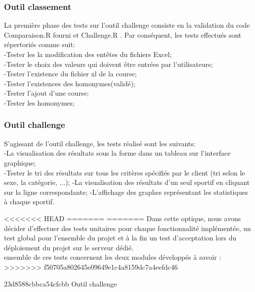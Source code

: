 \subsubsection{Outil classement}
La première phase  des tests sur l'outil challenge consiste en la validation du code  Comparaison.R fourni et Challenge.R . Par conséquent, les tests effectués sont répertoriés comme suit:\\
-Tester les la modification des entêtes du fichiers Excel;\\
-Tester le choix des valeurs qui doivent être entrées par l'utilisateurs;\\
-Tester l'existence du fichier xl de la course; \\
-Tester l'existences des homonymes(validé);\\
-Tester  l'ajout d'une course;\\
-Tester les homonymes;
\subsubsection{Outil challenge}
S'agissant de l'outil challenge, les tests réalisé sont les suivants:\\
-La visualisation des résultats sous la forme dans un tableau sur l'interface graphique; \\
-Tester le tri des résultats sur tous les critères spécifiés par le  client (tri selon le sexe, la catégorie, ...);
-La visualisation des résultats d'un seul sportif en cliquant sur la ligne correspondante;
-L'affichage des graphes représentant les statistiques à chaque sportif.

 

<<<<<<< HEAD
=======
=======
Dans cette optique, nous avons décider d'effectuer des tests unitaires pour chaque fonctionnalité implémentée, un test global pour l'ensemble du projet et à la fin un test d'acceptation lors du déploiement du projet sur le serveur dédié.\\
                                                                                                                                                                                                                                                ensemble de ces tests concernent les deux modules développés à savoir :
>>>>>>> f50705a802645e09649e1c4a8159dc7a4eefdc46


23d8588cbbca54cfcbb
{Outil challenge}

